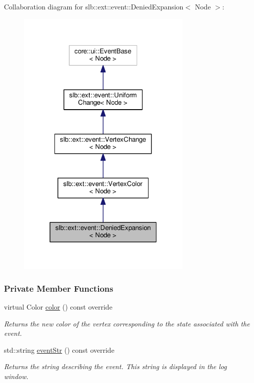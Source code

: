 Collaboration diagram for slb\+:\+:ext\+:\+:event\+:\+:Denied\+Expansion$<$ Node $>$\+:\nopagebreak
\begin{figure}[H]
\begin{center}
\leavevmode
\includegraphics[width=241pt]{structslb_1_1ext_1_1event_1_1DeniedExpansion__coll__graph}
\end{center}
\end{figure}
\subsubsection*{Private Member Functions}
\begin{DoxyCompactItemize}
\item 
virtual Color \hyperlink{structslb_1_1ext_1_1event_1_1DeniedExpansion_a6f2aa3f5f67e00c2c30aebd472872eda}{color} () const override
\begin{DoxyCompactList}\small\item\em Returns the new color of the vertex corresponding to the state associated with the event. \end{DoxyCompactList}\item 
std\+::string \hyperlink{structslb_1_1ext_1_1event_1_1DeniedExpansion_a159ac4c3963cd068b40d90ed30b75b3d}{event\+Str} () const override
\begin{DoxyCompactList}\small\item\em Returns the string describing the event. This string is displayed in the log window. \end{DoxyCompactList}\end{DoxyCompactItemize}
